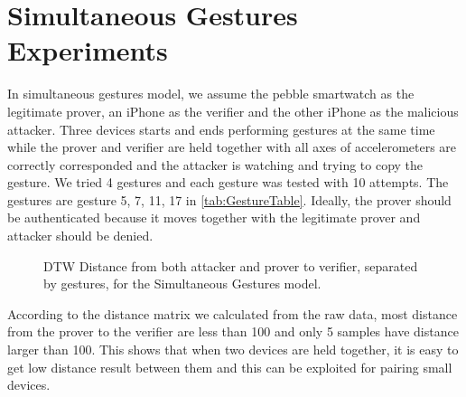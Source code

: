 


\section{Simultaneous Gestures \\ Experiments}
\label{sec:Simultaneous}
In simultaneous gestures model, we assume the pebble smartwatch as the legitimate prover, an iPhone as the verifier and the other iPhone as the malicious attacker. Three devices starts and ends performing gestures at the same time while the prover and verifier are held together with all axes of accelerometers are correctly corresponded and the attacker is watching and trying to copy the gesture. We tried 4 gestures and each gesture was tested with 10 attempts. The gestures are gesture 5, 7, 11, 17 in \autoref{tab:GestureTable}. Ideally, the prover should be authenticated because it moves together with the legitimate prover and attacker should be denied.

 \begin{figure*}[!t]
    	\centering
 	\subfloat[Gesture \#5 ]{
 	\centering
 	\tikzquarter
		
 		 \label{fig:s5}}
 	\subfloat[Gesture \#7]{
 	\centering
 	\tikzquarter
		
 		 \label{fig:s7}}
 	\subfloat[Gesture \#11]{
 	\centering
 	\tikzquarter
		
 		 \label{fig:s11}}
	\subfloat[Gesture \#17]{
 	\centering
 	\tikzquarter
		
 		 \label{fig:s17}}
 	\caption{DTW Distance from both attacker and prover to verifier, separated by gestures, for the Simultaneous Gestures model.}
 	\label{fig:SimultaneousDistanceMatrixPlot}
 \end{figure*}


According to the distance matrix we calculated from the raw data, most distance from the prover to the verifier are less than 100 and only 5 samples have distance larger than 100. This shows that when two devices are held together, it is easy to get low distance result between them and this can be exploited for pairing small devices.

